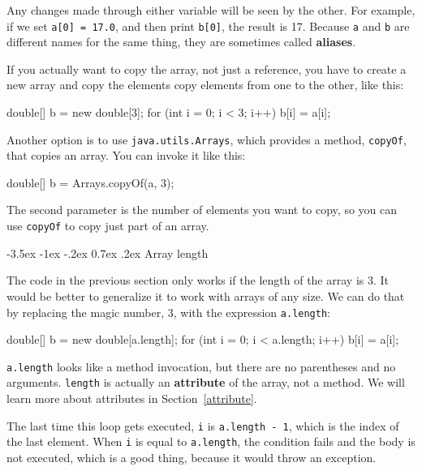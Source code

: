 \documentclass[12pt]{book}
\makeatletter
\theoremstyle{exercise}
\newcommand{\java}[1]{\verb"#1"}
\renewcommand{\section}{\@startsection{section}{1}{\z@}%
    {-3.5ex \@plus -1ex \@minus -.2ex}%
    {0.7ex \@plus.2ex}%
    {\normalfont\Large\bfseries}}
\newcommand{\java}[1]{\lstinline{#1}} %
\makeatother
\begin{document}
Any changes made through either variable will be seen by the other.
For example, if we set \java{a[0] = 17.0}, and then print {\tt b[0]}, the result is 17.
Because \java{a} and \java{b} are different names for the same thing, they are sometimes called {\bf aliases}.

If you actually want to copy the array, not just a reference, you have to create a new array and copy the elements copy elements from one to the other, like this:

\begin{code}
    double[] b = new double[3];
    for (int i = 0; i < 3; i++) {
        b[i] = a[i];
    }
\end{code}

Another option is to use \java{java.utils.Arrays}, which provides a method,
\java{copyOf}, that copies an array.
You can invoke it like this:

\begin{code}
    double[] b = Arrays.copyOf(a, 3);
\end{code}

The second parameter is the number of elements you want to copy, so you can use \java{copyOf} to copy just part of an array.


\section{Array length}


The code in the previous section only works if the length of the array is 3.
It would be better to generalize it to work with arrays of any size.
We can do that by replacing the magic number, 3, with the expression \java{a.length}:

\begin{code}
    double[] b = new double[a.length];
    for (int i = 0; i < a.length; i++) {
        b[i] = a[i];
    }
\end{code}

\java{a.length} looks like a method invocation, but there are no parentheses and no arguments.
\java{length} is actually an {\bf attribute} of the array, not a method.
We will learn more about attributes in Section~\ref{attribute}.

The last time this loop gets executed, \java{i} is \java{a.length - 1}, which is the index of the last element.
When \java{i} is equal to \java{a.length}, the condition fails and the body is not executed, which is a good thing, because it would throw an exception.
\end{document}
